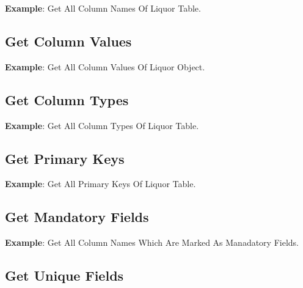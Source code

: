 				\par
				\textbf{Example}: Get All Column Names Of Liquor Table.
					


	\subsection{Get Column Values}
	

				\par
				\textbf{Example}: Get All Column Values Of Liquor Object.
					


	\subsection{Get Column Types}
	

				\par
				\textbf{Example}: Get All Column Types Of Liquor Table.
					


	\subsection{Get Primary Keys}
	

				\par
				\textbf{Example}: Get All Primary Keys Of Liquor Table.
					


	\subsection{Get Mandatory Fields}
	

				\par
				\textbf{Example}: Get All Column Names Which Are Marked As Manadatory Fields.
					

	\subsection{Get Unique Fields}
	

